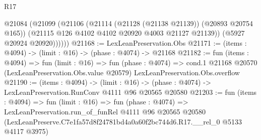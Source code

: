 \begin{lexlean}{R17}
\begin{coremodule}
          @21084
            (@21099
              (@21106
                (@21114 (@21128 (@21138 @21139)) (@20893 @20754 @165))
                (@21115 @126 @4102 @4102 @20920 @4003 @21127 @21139))
              (@5927 @20924 @20920))))))
@21168 := LexLeanPreservation.Obs
@21171 := (items : @4094) -> (limit : @16) -> (phase : @4074) -> @21168
@21182 := fun (items : @4094) =>
  fun (limit : @16) =>
  fun (phase : @4074) =>
  cond.{1} @21168 @20570 (LexLeanPreservation.Obs.value @20579) LexLeanPreservation.Obs.overflow
@21190 := (items : @4094) ->
  (limit : @16) -> (phase : @4074) -> LexLeanPreservation.RunConv @4111 @96 @20565 @20580
@21203 := fun (items : @4094) =>
  fun (limit : @16) =>
  fun (phase : @4074) =>
  LexLeanPreservation.run_of_funRel
    @4111
    @96
    @20565
    @20580
    (LexLeanPreserve.C7e1fa57d8f24781bd4a0a60f2bc744d6.R17.__rel_0 @5133 @4117 @3975)
\end{coremodule}
\end{lexlean}
